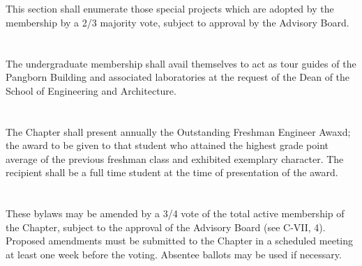 \documentclass[12pt]{constitution}
\begin{document}
\section{}
This section shall enumerate those special projects which are adopted by the membership by a 2/3 majority vote, subject to approval by the Advisory Board.
\section{}
The undergraduate membership shall avail themselves to act as tour guides of the Pangborn Building and associated laboratories at the request of the Dean of the School of Engineering and Architecture.
\section{} %
The Chapter shall present annually the Outstanding Freshman Engineer Awaxd; the award to be given to that student who attained the highest grade point average of the previous freshman class and exhibited exemplary character. The recipient shall be a full time student at the time of presentation of the award.

\section{}
These bylaws may be amended by a 3/4 vote of the total active membership of the Chapter, subject to the approval of the Advisory Board (see C-VII, 4). Proposed amendments must be submitted to the Chapter in a scheduled meeting at least one week
before the voting. Absentee ballots may be used if necessary.
\end{document}
